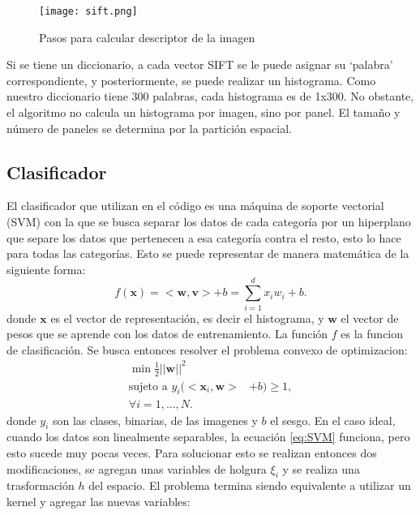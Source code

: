 \documentclass[10pt,twocolumn,letterpaper]{article}
\begin{document}
\begin{figure}[t]
\begin{center}
   \texttt{[image: sift.png]}
\end{center}
   \caption{Pasos para calcular descriptor de la imagen}
\label{fig:resknn}
\end{figure}

Si se tiene un diccionario, a cada vector SIFT se le puede asignar su ‘palabra’ correspondiente, y posteriormente, se puede realizar un histograma. Como nuestro diccionario tiene 300 palabras, cada histograma es de 1x300. No obstante, el algoritmo no calcula un histograma por imagen, sino por panel. El tamaño y número de paneles se determina por la partición espacial.
\subsection{Clasificador}
El clasificador que utilizan en el código es una máquina de soporte vectorial (SVM) con la que se busca separar los datos de cada categoría por un hiperplano que separe los datos que pertenecen a esa categoría contra el resto, esto lo hace para todas las categorías. Esto se puede representar de manera matemática de la siguiente forma: 
\begin{equation} \label{eq:SVM}
f(\textbf{x}) = <\textbf{w},\textbf{v}>+b = \sum_{i=1}^{d}x_i w_i + b.
\end{equation}
donde $\textbf{x}$ es el vector de representación, es decir el histograma, y $\textbf{w}$ el vector de pesos que se aprende con los datos de entrenamiento. La función $f$ es la funcion de clasificación. Se busca entonces resolver el problema convexo de optimizacion:
\begin{equation} \label{eq:probSVM}
\begin{split}
\min \frac{1}{2}||\textbf{w}||^2 \\
\text{sujeto a   } y_i(<\textbf{x}_i,\textbf{w}> &+ b) \geq 1, \\
\forall i =1,...,N.
\end{split}
\end{equation}
donde $y_i$ son las clases, binarias, de las imagenes y $b$ el sesgo. 
En el caso ideal, cuando los datos son linealmente separables, la ecuación \ref{eq:SVM} funciona, pero esto sucede muy pocas veces. Para solucionar esto se realizan entonces dos modificaciones, se agregan unas variables de holgura $\xi _i$ y se realiza una trasformación $h$ del espacio. El problema termina siendo equivalente a utilizar un kernel y agregar las nuevas variables:
\end{document}
